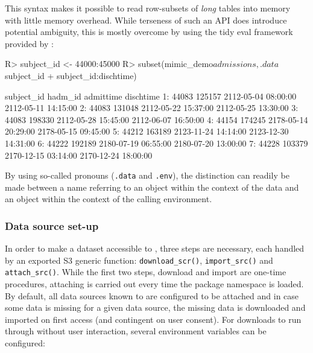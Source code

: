 \documentclass[
  notitle]{jss}
\begin{document}
This syntax makes it possible to read row-subsets of \emph{long} tables
into memory with little memory overhead. While terseness of such an API
does introduce potential ambiguity, this is mostly overcome by using the
tidy eval framework provided by  \citep{wickham2020}:

\begin{CodeChunk}
\begin{CodeInput}
R> subject_id <- 44000:45000
R> subset(mimic_demo$admissions, .data$subject_id %
+        subject_id:dischtime)
\end{CodeInput}
\begin{CodeOutput}
   subject_id hadm_id           admittime           dischtime
1:      44083  125157 2112-05-04 08:00:00 2112-05-11 14:15:00
2:      44083  131048 2112-05-22 15:37:00 2112-05-25 13:30:00
3:      44083  198330 2112-05-28 15:45:00 2112-06-07 16:50:00
4:      44154  174245 2178-05-14 20:29:00 2178-05-15 09:45:00
5:      44212  163189 2123-11-24 14:14:00 2123-12-30 14:31:00
6:      44222  192189 2180-07-19 06:55:00 2180-07-20 13:00:00
7:      44228  103379 2170-12-15 03:14:00 2170-12-24 18:00:00
\end{CodeOutput}
\end{CodeChunk}

By using so-called pronouns (\texttt{.data} and \texttt{.env}), the
distinction can readily be made between a name referring to an object
within the context of the data and an object within the context of the
calling environment.

\hypertarget{data-source-set-up}{%
\subsubsection{Data source set-up}\label{data-source-set-up}}

In order to make a dataset accessible to , three steps are
necessary, each handled by an exported S3 generic function:
\texttt{download\_scr()}, \texttt{import\_src()} and
\texttt{attach\_src()}. While the first two steps, download and import
are one-time procedures, attaching is carried out every time the package
namespace is loaded. By default, all data sources known to 
are configured to be attached and in case some data is missing for a
given data source, the missing data is downloaded and imported on first
access (and contingent on user consent). For downloads to run through
without user interaction, several environment variables can be
configured:
\end{document}
